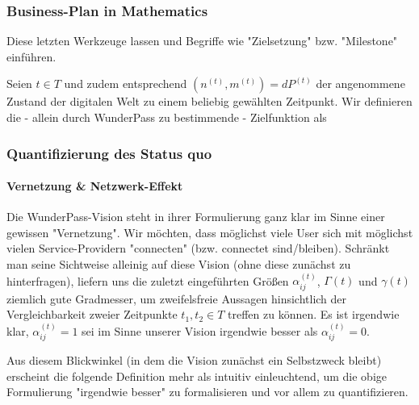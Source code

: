 \subsubsection{Business-Plan in Mathematics}
\label{sec:eco_zahlen_business_plan}

Diese letzten Werkzeuge lassen und Begriffe wie "Zielsetzung" bzw. "Milestone" einführen.

\vspace{0.3cm}

\begin{Def}\label{defZiel}

Seien $t \in T$ und zudem entsprechend $(n^{(t)}, m^{(t)}) = dP^{(t)}$ der angenommene Zustand der digitalen Welt zu einem beliebig gewählten Zeitpunkt. Wir definieren die - allein durch WunderPass zu bestimmende - Zielfunktion als

\end{Def}


\subsubsection{Quantifizierung des Status quo}
\label{sec:eco_zahlen_status_quo}



\paragraph{Vernetzung \& Netzwerk-Effekt}
\label{sec:zahlen_status_quo_netzwerk_effekt}

\textrm{ }
\vspace{0.3cm}

Die WunderPass-Vision steht in ihrer Formulierung ganz klar im Sinne einer gewissen "Vernetzung". Wir möchten, dass möglichst viele User sich mit möglichst vielen Service-Providern "connecten" (bzw. connectet sind/bleiben). Schränkt man seine Sichtweise alleinig auf diese Vision (ohne diese zunächst zu hinterfragen), liefern uns die zuletzt eingeführten Größen $\alpha^{(t)}_{ij}$, $\Gamma(t)$ und $\gamma(t)$ ziemlich gute Gradmesser, um zweifelsfreie Aussagen hinsichtlich der Vergleichbarkeit zweier Zeitpunkte $t_1, t_2 \in T$ treffen zu können. Es ist irgendwie klar, $\alpha^{(t)}_{ij} = 1$ sei im Sinne unserer Vision irgendwie besser als $\alpha^{(t)}_{ij} = 0$.

Aus diesem Blickwinkel (in dem die Vision zunächst ein Selbstzweck bleibt) erscheint die folgende Definition mehr als intuitiv einleuchtend, um die obige Formulierung "irgendwie besser" zu formalisieren und vor allem zu quantifizieren. 



















